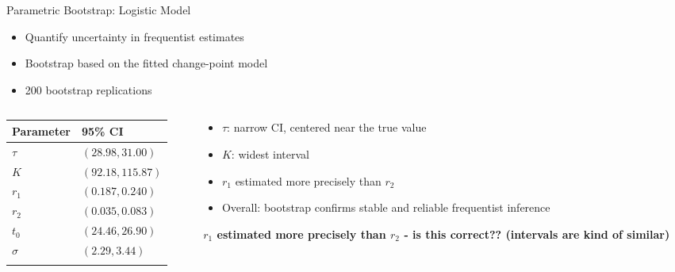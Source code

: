 \documentclass[
  ignorenonframetext,
  aspectratio=169,
]{beamer}
\providecommand{\tightlist}{%
  \setlength{\itemsep}{0pt}\setlength{\parskip}{0pt}}\usepackage{longtable,booktabs,array}
\begin{document}
\begin{frame}{Parametric Bootstrap: Logistic Model}
\label{parametric-bootstrap-logistic-model}
\begin{itemize}
\tightlist
\item
  Quantify uncertainty in frequentist estimates
\item
  Bootstrap based on the fitted change-point model
\item
  200 bootstrap replications
\end{itemize}

\begin{columns}[T]
\begin{column}{0.5\textwidth}
\vspace{-10pt}

\begin{longtable}[]{@{}ll@{}}
\toprule\noalign{}
Parameter & 95\% CI \\
\midrule\noalign{}
\endhead
\(\tau\) & \((28.98, 31.00)\) \\
\(K\) & \((92.18, 115.87)\) \\
\(r_1\) & \((0.187, 0.240)\) \\
\(r_2\) & \((0.035, 0.083)\) \\
\(t_0\) & \((24.46, 26.90)\) \\
\(\sigma\) & \((2.29, 3.44)\) \\
\bottomrule\noalign{}
\end{longtable}
\end{column}

\begin{column}{0.5\textwidth}
\begin{itemize}
\tightlist
\item
  \(\tau\): narrow CI, centered near the true value
\item
  \(K\): widest interval
\item
  \(r_1\) estimated more precisely than \(r_2\)
\item
  Overall: bootstrap confirms stable and reliable frequentist inference
\end{itemize}

\textbf{\(r_1\) estimated more precisely than \(r_2\) - is this
correct?? (intervals are kind of similar)}
\end{column}
\end{columns}
\end{frame}
\end{document}

